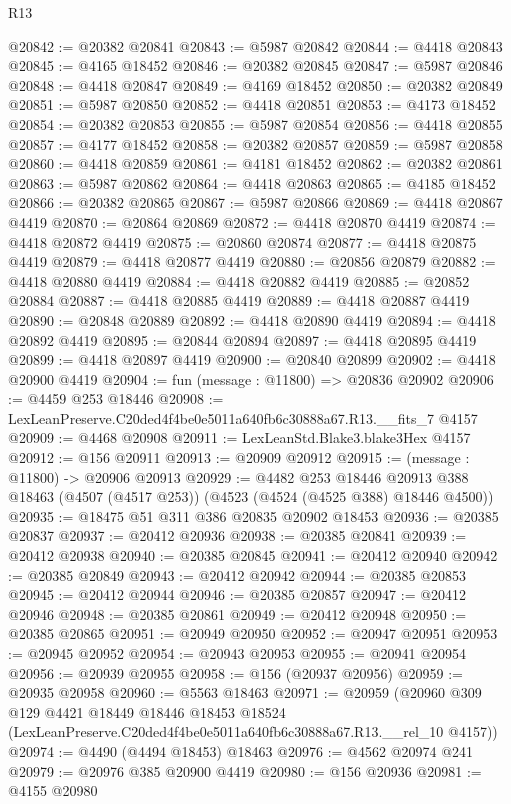 \begin{lexlean}{R13}
\begin{coremodule}
@20842 := @20382 @20841
@20843 := @5987 @20842
@20844 := @4418 @20843
@20845 := @4165 @18452
@20846 := @20382 @20845
@20847 := @5987 @20846
@20848 := @4418 @20847
@20849 := @4169 @18452
@20850 := @20382 @20849
@20851 := @5987 @20850
@20852 := @4418 @20851
@20853 := @4173 @18452
@20854 := @20382 @20853
@20855 := @5987 @20854
@20856 := @4418 @20855
@20857 := @4177 @18452
@20858 := @20382 @20857
@20859 := @5987 @20858
@20860 := @4418 @20859
@20861 := @4181 @18452
@20862 := @20382 @20861
@20863 := @5987 @20862
@20864 := @4418 @20863
@20865 := @4185 @18452
@20866 := @20382 @20865
@20867 := @5987 @20866
@20869 := @4418 @20867 @4419
@20870 := @20864 @20869
@20872 := @4418 @20870 @4419
@20874 := @4418 @20872 @4419
@20875 := @20860 @20874
@20877 := @4418 @20875 @4419
@20879 := @4418 @20877 @4419
@20880 := @20856 @20879
@20882 := @4418 @20880 @4419
@20884 := @4418 @20882 @4419
@20885 := @20852 @20884
@20887 := @4418 @20885 @4419
@20889 := @4418 @20887 @4419
@20890 := @20848 @20889
@20892 := @4418 @20890 @4419
@20894 := @4418 @20892 @4419
@20895 := @20844 @20894
@20897 := @4418 @20895 @4419
@20899 := @4418 @20897 @4419
@20900 := @20840 @20899
@20902 := @4418 @20900 @4419
@20904 := fun (message : @11800) => @20836 @20902
@20906 := @4459 @253 @18446
@20908 := LexLeanPreserve.C20ded4f4be0e5011a640fb6c30888a67.R13.__fits_7 @4157
@20909 := @4468 @20908
@20911 := LexLeanStd.Blake3.blake3Hex @4157
@20912 := @156 @20911
@20913 := @20909 @20912
@20915 := (message : @11800) -> @20906 @20913
@20929 := @4482
    @253
    @18446
    @20913
    @388
    @18463
    (@4507 (@4517 @253))
    (@4523 (@4524 (@4525 @388) @18446 @4500))
@20935 := @18475 @51 @311 @386 @20835 @20902 @18453
@20936 := @20385 @20837
@20937 := @20412 @20936
@20938 := @20385 @20841
@20939 := @20412 @20938
@20940 := @20385 @20845
@20941 := @20412 @20940
@20942 := @20385 @20849
@20943 := @20412 @20942
@20944 := @20385 @20853
@20945 := @20412 @20944
@20946 := @20385 @20857
@20947 := @20412 @20946
@20948 := @20385 @20861
@20949 := @20412 @20948
@20950 := @20385 @20865
@20951 := @20949 @20950
@20952 := @20947 @20951
@20953 := @20945 @20952
@20954 := @20943 @20953
@20955 := @20941 @20954
@20956 := @20939 @20955
@20958 := @156 (@20937 @20956)
@20959 := @20935 @20958
@20960 := @5563 @18463
@20971 := @20959
    (@20960
      @309
      @129
      @4421
      @18449
      @18446
      @18453
      @18524
      (LexLeanPreserve.C20ded4f4be0e5011a640fb6c30888a67.R13.__rel_10 @4157))
@20974 := @4490 (@4494 @18453) @18463
@20976 := @4562 @20974 @241
@20979 := @20976 @385 @20900 @4419
@20980 := @156 @20936
@20981 := @4155 @20980

\end{coremodule}
\end{lexlean}

